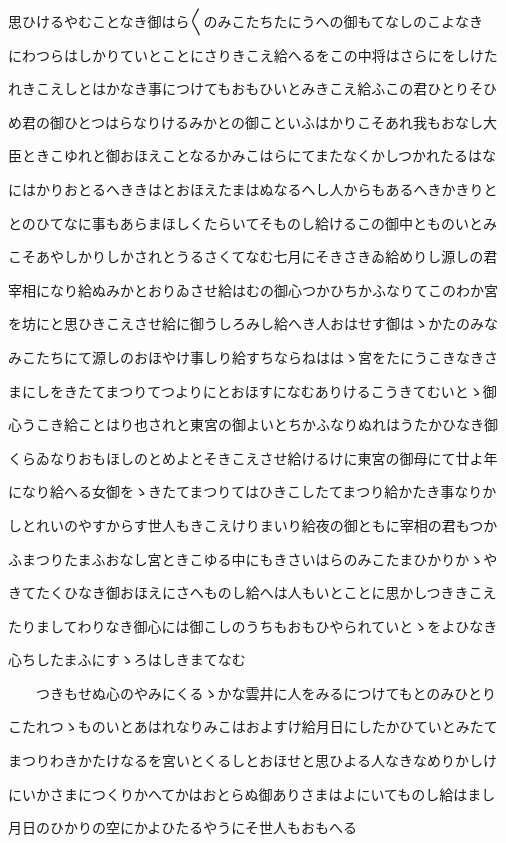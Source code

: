 \documentclass[a4paper,11pt,landscape]{ltjtarticle}
\begin{document}
思ひけるやむことなき御はら〱のみこたちたにうへの御もてなしのこよなき
\par\medskip
にわつらはしかりていとことにさりきこえ給へるをこの中将はさらにをしけた
\par\medskip
れきこえしとはかなき事につけてもおもひいとみきこえ給ふこの君ひとりそひ
\par\medskip
め君の御ひとつはらなりけるみかとの御こといふはかりこそあれ我もおなし大
\par\medskip
臣ときこゆれと御おほえことなるかみこはらにてまたなくかしつかれたるはな
\par\medskip
にはかりおとるへききはとおほえたまはぬなるへし人からもあるへきかきりと
\par\medskip
とのひてなに事もあらまほしくたらいてそものし給けるこの御中とものいとみ
\par\medskip
こそあやしかりしかされとうるさくてなむ七月にそきさきゐ給めりし源しの君
\par\medskip
宰相になり給ぬみかとおりゐさせ給はむの御心つかひちかふなりてこのわか宮
\par\medskip
を坊にと思ひきこえさせ給に御うしろみし給へき人おはせす御はゝかたのみな
\par\medskip
みこたちにて源しのおほやけ事しり給すちならねははゝ宮をたにうこきなきさ
\par\medskip
まにしをきたてまつりてつよりにとおほすになむありけるこうきてむいとゝ御
\par\medskip
心うこき給ことはり也されと東宮の御よいとちかふなりぬれはうたかひなき御
\par\medskip
くらゐなりおもほしのとめよとそきこえさせ給けるけに東宮の御母にて廿よ年
\par\medskip
になり給へる女御をゝきたてまつりてはひきこしたてまつり給かたき事なりか
\par\medskip
しとれいのやすからす世人もきこえけりまいり給夜の御ともに宰相の君もつか
\par\medskip
ふまつりたまふおなし宮ときこゆる中にもきさいはらのみこたまひかりかゝや
\par\medskip
きてたくひなき御おほえにさへものし給へは人もいとことに思かしつききこえ
\par\medskip
たりましてわりなき御心には御こしのうちもおもひやられていとゝをよひなき
\par\medskip
心ちしたまふにすゝろはしきまてなむ
\par\medskip
　　つきもせぬ心のやみにくるゝかな雲井に人をみるにつけてもとのみひとり
\par\medskip
こたれつゝものいとあはれなりみこはおよすけ給月日にしたかひていとみたて
\par\medskip
まつりわきかたけなるを宮いとくるしとおほせと思ひよる人なきなめりかしけ
\par\medskip
にいかさまにつくりかへてかはおとらぬ御ありさまはよにいてものし給はまし
\par\medskip
月日のひかりの空にかよひたるやうにそ世人もおもへる
\par\medskip
\end{document}
